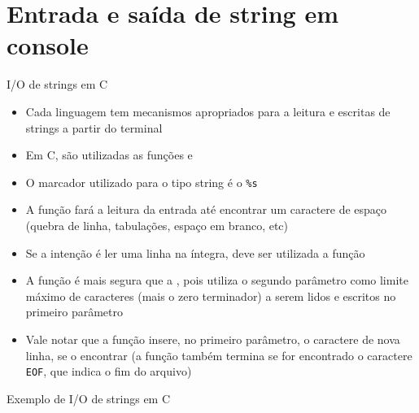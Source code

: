 \section{Entrada e saída de string em console}

\begin{frame}[fragile]{I/O de strings em C}

    \begin{itemize}
        \item Cada linguagem tem mecanismos apropriados para a leitura e escritas de strings a partir do terminal

        \item Em C, são utilizadas as funções  e 

        \item O marcador utilizado para o tipo string é o \verb|%s|

        \item A função  fará a leitura da entrada até encontrar um caractere de 
            espaço (quebra de linha, tabulações, espaço em branco, etc)

        \item Se a intenção é ler uma linha na íntegra, deve ser utilizada a função 

        \item A função  é mais segura que a , pois utiliza o 
            segundo parâmetro como limite máximo de caracteres (mais o zero terminador) a serem 
            lidos e escritos no primeiro parâmetro

        \item Vale notar que a função  insere, no primeiro parâmetro, o caractere 
            de nova linha, se o encontrar (a função também termina se for encontrado o caractere 
            \texttt{EOF}, que indica o fim do arquivo)
    \end{itemize}

\end{frame}

\begin{frame}[fragile]{Exemplo de I/O de strings em C}
\end{frame}


